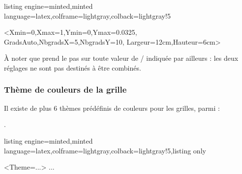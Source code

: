 \documentclass[11pt,a4paper]{ltxdoc}
\begin{document}
\begin{tcblisting}{listing engine=minted,minted language=latex,colframe=lightgray,colback=lightgray!5}
\begin{GraphiqueTikz}%
  <Xmin=0,Xmax=1,Ymin=0,Ymax=0.0325,%
  GradsAuto,NbgradsX=5,NbgradsY=10,%
  Largeur=12cm,Hauteur=6cm>
\end{GraphiqueTikz}
\end{tcblisting}

À noter que  prend le pas sur toute valeur de / indiquée par ailleurs : les deux réglages ne sont pas destinés à être combinés.

\pagebreak

\subsubsection{Thème de couleurs de la grille}

Il existe de plus 6 thèmes prédéfinis de couleurs pour les grilles, parmi :

.

\begin{tcblisting}{listing engine=minted,minted language=latex,colframe=lightgray,colback=lightgray!5,listing only}
\begin{GraphiqueTikz}[options]<Theme=...>
  ...
\end{GraphiqueTikz}
\end{tcblisting}
\end{document}
